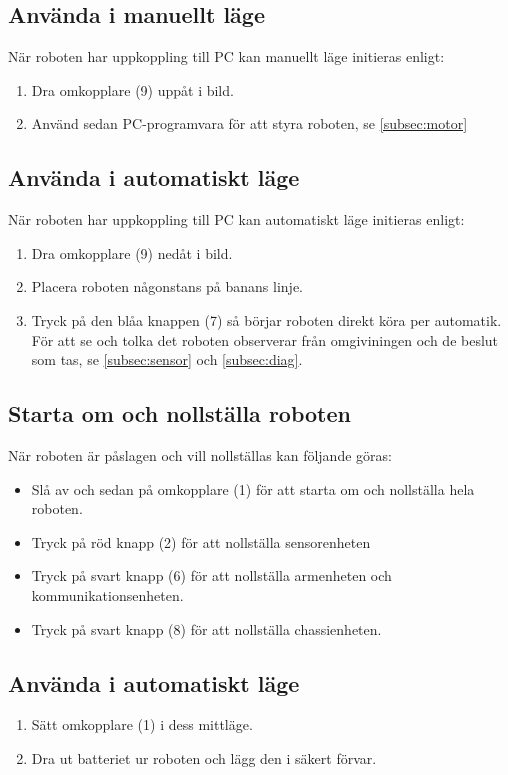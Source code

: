 \documentclass[a4paper,12pt]{article}
\begin{document}
\subsection{Använda i manuellt läge}
När roboten har uppkoppling till PC kan manuellt läge initieras enligt:
\begin{enumerate}
    \item Dra omkopplare (9) uppåt i bild.
    \item Använd sedan PC-programvara för att styra roboten, se \ref{subsec:motor}
\end{enumerate}

\subsection{Använda i automatiskt läge}
När roboten har uppkoppling till PC kan automatiskt läge initieras enligt:
\begin{enumerate}
    \item Dra omkopplare (9) nedåt i bild.
    \item Placera roboten någonstans på banans linje. 
    \item Tryck på den blåa knappen (7) så börjar roboten direkt köra per automatik. För att se och tolka det roboten observerar från omgiviningen och de beslut som tas, se \ref{subsec:sensor} och \ref{subsec:diag}.
\end{enumerate}

\subsection{Starta om och nollställa roboten}
När roboten är påslagen och vill nollställas kan följande göras:
\begin{itemize}
\item Slå av och sedan på omkopplare (1) för att starta om och nollställa hela roboten.
\item Tryck på röd knapp (2) för att nollställa sensorenheten
\item Tryck på svart knapp (6) för att nollställa armenheten och kommunikationsenheten.
\item Tryck på svart knapp (8) för att nollställa chassienheten. 
\end{itemize}

\subsection{Använda i automatiskt läge}
\begin{enumerate}
    \item Sätt omkopplare (1) i dess mittläge.
    \item Dra ut batteriet ur roboten och lägg den i säkert förvar.
\end{enumerate}
\end{document}
